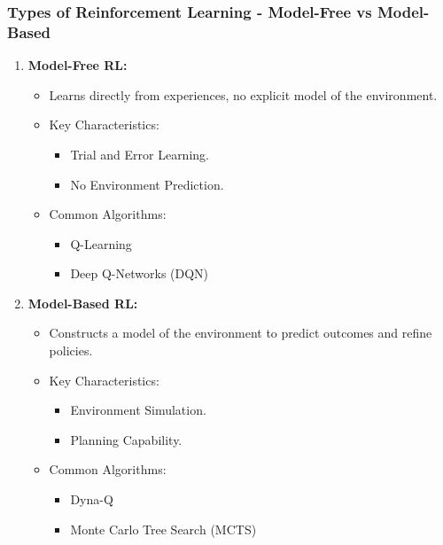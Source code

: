 \documentclass[aspectratio=169]{beamer}
\begin{document}
\begin{frame}[fragile]
  \frametitle{Types of Reinforcement Learning - Model-Free vs Model-Based}
  
  \begin{enumerate}
    \item \textbf{Model-Free RL:}
    \begin{itemize}
      \item Learns directly from experiences, no explicit model of the environment.
      \item Key Characteristics:
      \begin{itemize}
        \item Trial and Error Learning.
        \item No Environment Prediction.
      \end{itemize}
      \item Common Algorithms:
      \begin{itemize}
        \item Q-Learning
        \item Deep Q-Networks (DQN)
      \end{itemize}
    \end{itemize}
    
    \item \textbf{Model-Based RL:}
    \begin{itemize}
      \item Constructs a model of the environment to predict outcomes and refine policies.
      \item Key Characteristics:
      \begin{itemize}
        \item Environment Simulation.
        \item Planning Capability.
      \end{itemize}
      \item Common Algorithms:
      \begin{itemize}
        \item Dyna-Q
        \item Monte Carlo Tree Search (MCTS)
      \end{itemize}
    \end{itemize}
  \end{enumerate}
  
\end{frame}
\end{document}
